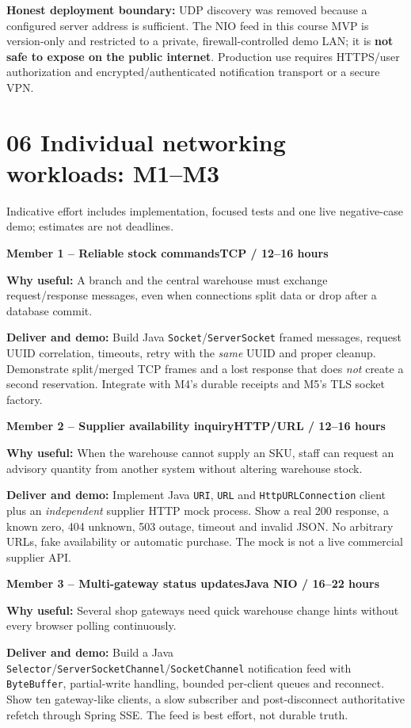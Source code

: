 \documentclass[10pt,a4paper]{article}
\newcommand{\quiet}[1]{{\color{muted}#1}}
\newcommand{\member}[4]{%
  \begin{tcolorbox}[colback=white,colframe=edge,boxrule=0.7pt,arc=2mm,left=3mm,right=3mm,top=2.2mm,bottom=2.2mm]
    {\large\bfseries\color{navy}#1}\hfill{\small\bfseries\color{teal}#2}\par
    \textbf{Why useful:} #3\par
    \textbf{Deliver and demo:} #4
  \end{tcolorbox}%
}
\begin{document}
\begin{warnbox}
\textbf{Honest deployment boundary:} UDP discovery was removed because a configured server address is sufficient. The NIO feed in this course MVP is version-only and restricted to a private, firewall-controlled demo LAN; it is \textbf{not safe to expose on the public internet}. Production use requires HTTPS/user authorization and encrypted/authenticated notification transport or a secure VPN.
\end{warnbox}

\newpage

\section*{06 \quad Individual networking workloads: M1--M3}
\quiet{Indicative effort includes implementation, focused tests and one live negative-case demo; estimates are not deadlines.}

\member{Member 1 -- Reliable stock commands}{TCP / 12--16 hours}
{A branch and the central warehouse must exchange request/response messages, even when connections split data or drop after a database commit.}
{Build Java \texttt{Socket}/\texttt{ServerSocket} framed messages, request UUID correlation, timeouts, retry with the \emph{same} UUID and proper cleanup. Demonstrate split/merged TCP frames and a lost response that does \emph{not} create a second reservation. Integrate with M4's durable receipts and M5's TLS socket factory.}

\vspace{2mm}
\member{Member 2 -- Supplier availability inquiry}{HTTP/URL / 12--16 hours}
{When the warehouse cannot supply an SKU, staff can request an advisory quantity from another system without altering warehouse stock.}
{Implement Java \texttt{URI}, \texttt{URL} and \texttt{HttpURLConnection} client plus an \emph{independent} supplier HTTP mock process. Show a real 200 response, a known zero, 404 unknown, 503 outage, timeout and invalid JSON. No arbitrary URLs, fake availability or automatic purchase. The mock is not a live commercial supplier API.}

\vspace{2mm}
\member{Member 3 -- Multi-gateway status updates}{Java NIO / 16--22 hours}
{Several shop gateways need quick warehouse change hints without every browser polling continuously.}
{Build a Java \texttt{Selector}/\texttt{ServerSocketChannel}/\texttt{SocketChannel} notification feed with \texttt{ByteBuffer}, partial-write handling, bounded per-client queues and reconnect. Show ten gateway-like clients, a slow subscriber and post-disconnect authoritative refetch through Spring SSE. The feed is best effort, not durable truth.}
\end{document}
